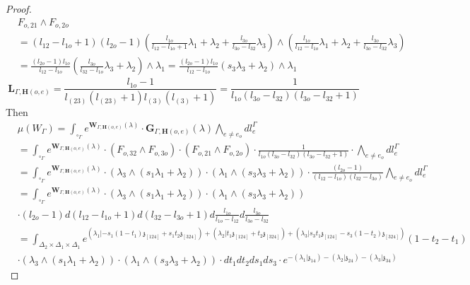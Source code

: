 \documentclass[11pt]{amsart}
\theoremstyle{definition}
\theoremstyle{remark}
\numberwithin{equation}{section}
\begin{document}
\begin{proof}
 \begin{align*}
    & F_{o,21}\wedge F_{o,2o}  \\
    & =(l_{12}-l_{1o}+1)(l_{2o}-1)\left(\frac{l_{1o}}{l_{12}-l_{1o}+1}\lambda_1+\lambda_2+\frac{l_{3o}}{l_{3o}-l_{32}}\lambda_3\right)\wedge \left(\frac{l_{1o}}{l_{12}-l_{1o}}\lambda_1+\lambda_2+\frac{l_{3o}}{l_{3o}-l_{32}}\lambda_3\right)\\
    &=\frac{(l_{2o}-1)l_{1o}}{l_{12}-l_{1o}}\left(\frac{l_{3o}}{l_{32}-l_{1o}}\lambda_3+\lambda_2\right)\wedge\lambda_1=\frac{(l_{2o}-1)l_{1o}}{l_{12}-l_{1o}}\left(s_3\lambda_3+\lambda_2\right)\wedge\lambda_1
 \end{align*}
 $$
 \mathbf{L}_{\Gamma,\mathbf{H}(o,e)}=\frac{l_{1o}-1}{l_{(23)}(l_{(23)}+1)l_{(3)}(l_{(3)}+1)}=\frac{1}{l_{1o}(l_{3o}-l_{32})(l_{3o}-l_{32}+1)}
 $$
 Then
 \begin{align*}
    &  \mu(W_{\Gamma})=\int_{\square_{\Gamma}}e^{\mathbf{W}_{\Gamma,\mathbf{H}(o,e)}(\lambda)}\cdot \mathbf{G}_{\Gamma,\mathbf{H}(o,e)}(\lambda)\bigwedge_{e\neq e_{o}}dl^{\Gamma}_{e} \\
    & =\int_{\square_{\Gamma}}e^{\mathbf{W}_{\Gamma,\mathbf{H}(o,e)}(\lambda)}\cdot (F_{o,32}\wedge F_{o,3o} )\cdot (F_{o,21}\wedge F_{o,2o} )\cdot\frac{1}{l_{1o}(l_{3o}-l_{32})(l_{3o}-l_{32}+1)}\cdot\bigwedge_{e\neq e_{o}}dl^{\Gamma}_{e}\\
    &=\int_{\square_{\Gamma}}e^{\mathbf{W}_{\Gamma,\mathbf{H}(o,e)}(\lambda)}\cdot (\lambda_3\wedge(s_1\lambda_1+\lambda_2))\cdot (\lambda_1\wedge(s_3\lambda_3+\lambda_2))\cdot \frac{(l_{2o}-1)}{(l_{12}-l_{1o})(l_{32}-l_{3o})}  \bigwedge_{e\neq e_{o}}dl^{\Gamma}_{e}\\
    &=\int_{\square_{\Gamma}}e^{\mathbf{W}_{\Gamma,\mathbf{H}(o,e)}(\lambda)}\cdot (\lambda_3\wedge(s_1\lambda_1+\lambda_2))\cdot (\lambda_1\wedge(s_3\lambda_3+\lambda_2))\\
    &\cdot (l_{2o}-1)d(l_{12}-l_{1o}+1)d(l_{32}-l_{3o}+1)d\frac{l_{1o}}{l_{1o} -l_{12}}d\frac{l_{3o}}{l_{3o} -l_{32}}\\
    &=\int_{\Delta_2\times\Delta_1\times\Delta_1}e^{   (\lambda_1|-s_1(1-t_1)\mathfrak{z}_{[124]}+s_1t_2\mathfrak{z}_{[324]})+ (\lambda_2|t_1\mathfrak{z}_{[124]}+t_2 \mathfrak{z}_{[324]})+      (\lambda_3|s_3t_1\mathfrak{z}_{[124]}-s_3(1-t_2)\mathfrak{z}_{[324]})}(1-t_2-t_1)\\
   &\cdot(\lambda_3\wedge(s_1\lambda_1+\lambda_2))\cdot (\lambda_1\wedge(s_3\lambda_3+\lambda_2)) \cdot dt_1dt_2ds_1ds_3\cdot e^{-(\lambda_1|\mathfrak{z}_{14})-(\lambda_2|\mathfrak{z}_{24})-(\lambda_3|\mathfrak{z}_{34})}
 \end{align*}

\end{proof}
\end{document}
